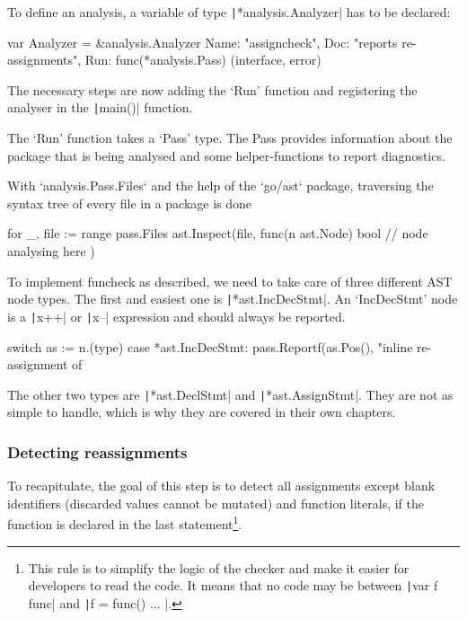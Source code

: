 To define an analysis, a variable of type \texttt|*analysis.Analyzer| has to be declared:

\begin{gocode}
var Analyzer = &analysis.Analyzer{
	Name: "assigncheck",
	Doc:  "reports re-assignments",
	Run:  func(*analysis.Pass) (interface{}, error)
}
\end{gocode}
The necessary steps are now adding the `Run' function and registering the analyser
in the \texttt|main()| function.

The `Run' function takes a `Pass' type. The Pass provides information about the package
that is being analysed and some helper-functions to report diagnostics.

With `analysis.Pass.Files` and the help of the `go/ast` package, traversing the syntax
tree of every file in a package is done %

\begin{gocode}
for _, file := range pass.Files {
	ast.Inspect(file, func(n ast.Node) bool {
		// node analysing here
	})
}
\end{gocode}
To implement funcheck as described, we need to %
take care of three different AST node types. The first and easiest one is
\texttt|*ast.IncDecStmt|. An `IncDecStmt' node is a \texttt|x++|
or \texttt|x--| expression and should always be reported.

\begin{gocode}
switch as := n.(type) {
case *ast.IncDecStmt:
	pass.Reportf(as.Pos(), "inline re-assignment of %
}
\end{gocode}
The other two types are \texttt|*ast.DeclStmt| and \texttt|*ast.AssignStmt|.
They are not as simple to handle, which is why they are covered in their own chapters.

\subsubsection{Detecting reassignments}

To recapitulate, the goal of this step is to detect all assignments except blank identifiers
(discarded values cannot be mutated) and function literals, if the function is declared in the
last statement\footnote{This rule is to simplify the logic of the checker and make it easier
    for developers to read the code. It means that no code may be between \texttt|var f func|
and \texttt|f = func() { ... }|.}.

